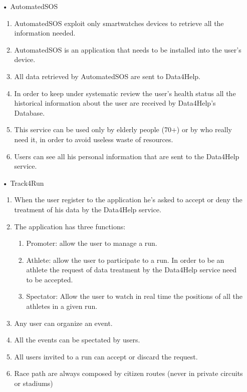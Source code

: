 \begin{enumerate}
\item[•] {\Large AutomatedSOS}
	\begin{enumerate}
	\item AutomatedSOS exploit only smartwatches devices to retrieve all the information needed.
	\item AutomatedSOS is an application that needs to be installed into the user's device.
	\item All data retrieved by AutomatedSOS are sent to Data4Help.
	\item In order to keep under systematic review the user's health status all the historical information about the user are received by Data4Help's Database.
    \item This service can be used only by elderly people (70+) or by who really need it, in order to avoid useless waste of resources.
    \item Users can see all his personal information that are sent to the Data4Help service. 
	\end{enumerate}
	
\item[•] {\Large Track4Run}
	\begin{enumerate}
	\item When the user register to the application he's asked to accept or deny the treatment of his data by the Data4Help service.
	\item The application has three functions: 
	\begin{enumerate}
	\item Promoter: allow the user to manage a run.  
	\item Athlete: allow the user to participate to a run. In order to be an athlete the request of data treatment by the Data4Help service need to be accepted.
	\item Spectator: Allow the user to watch in real time the positions of all the athletes in a given run.
	\end{enumerate}
	\item Any user can organize an event.
    \item All the events can be spectated by users.
    \item All users invited to a run can accept or discard the request.
    \item Race path are always composed by citizen routes (never in private circuits or stadiums)
    \end{enumerate}
\end{enumerate}

